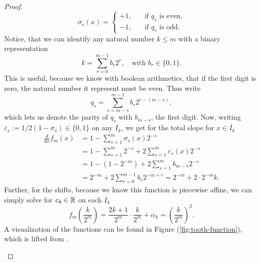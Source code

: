 \begin{proof}
    \begin{equation*}
        \sigma_s(x) = \begin{cases}
            +1, \quad &\text{if }q_s \text{ is even,}\\
            -1, \quad &\text{if }q_s \text{ is odd.}
        \end{cases}
    \end{equation*}
    Notice, that we can identify any natural number $k \leq m$ with a binary representation
    \begin{equation*}
        k = \sum_{r=0}^{m-1} b_r 2^{r}, \quad \text{with } b_r \in \{0, 1\}.
    \end{equation*}
    This is useful, because we know with boolean arithmetics, that if the first digit is zero, the natural number
    it represent must be even. Thus write
    \begin{equation*}
        q_s = \sum_{r = m-s}^{m-1} b_r 2^{r-(m-s)},
    \end{equation*}
    which lets us denote the parity of $q_s$ with $b_{m-s}$, the first digit. Now, writing $\varepsilon_s := 1/2(1 - \sigma_s) \in \{0, 1\}$
    on any $I_k$, we get for the total slope for $x \in \mathring{I_k}$
    \begin{align*}
        \frac{d}{dx} f_m(x) &= 1 - \sum_{s=1}^{m} \sigma_s(x) 2^{-s} \\
        &= 1 - \sum_{s=1}^{m} 2^{-s} + 2 \sum_{s=1}^{m} \varepsilon_s(x) 2^{-s} \\
        &= 1 - (1 - 2^{-m}) + 2 \sum_{s=1}^m b_{m-s} 2^{-s} \\
        &= 2^{-m}+ 2 \sum_{r=0}^{m-1} b_r 2^{-m+r} = 2^{-m} + 2 \cdot 2^{-m} k.
    \end{align*}
    Further, for the shifts, because we know this function is piecewise affine, 
    we can simply solve for $c_k \in \mathbb{R}$ on each $I_k$
    \begin{equation*}
        f_m\left(\frac{k}{2^m}\right) = \frac{2k+1}{2^m} \cdot \frac{k}{2^m} + \alpha_k = \left(\frac{k}{2^m}\right)^2.
    \end{equation*}
    A visualization of the functions can be found in 
    Figure (\ref{fig:tooth-function}), which is lifted from \cite{yarotsky2017nn}.
    \begin{figure}[tb]
        \centering
        \begin{subfigure}[t]{0.40\textwidth}
          \centering
\end{subfigure}
\end{figure}
\end{proof}
